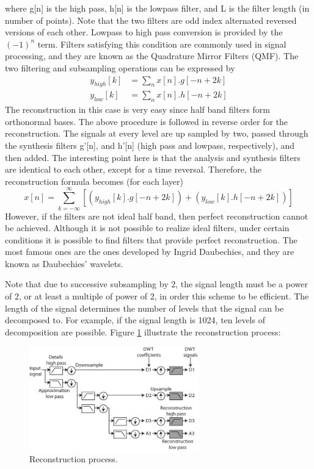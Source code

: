\documentclass[12pt, a4paper, twoside]{report}
\begin{document}
where g[n] is the high pass, h[n] is the lowpass filter, and L is the filter length (in number of points). Note that the two filters are odd index alternated reversed versions of each other. Lowpass to high pass conversion is provided by the $(-1)^n$ term. Filters satisfying this condition are commonly used in signal processing, and they are known as the Quadrature Mirror Filters (QMF). The two filtering and subsampling operations can be expressed by
\begin{align}
y_{high}[k] &= \sum_{n} x[n].g[-n+2k] \\ 
y_{low}[k] &= \sum_{n} x[n].h[-n+2k]
\end{align}
The reconstruction in this case is very easy since half band filters form orthonormal bases. The above procedure is followed in reverse order for the reconstruction. The signals at every level are up sampled by two, passed through the synthesis filters g’[n], and h’[n] (high pass and lowpass, respectively), and then added. The interesting point here is that the analysis and synthesis filters are identical to each other, except for a time reversal. Therefore, the reconstruction formula becomes (for each layer)
\begin{equation}
x[n] = \sum_{k=-\infty}^{\infty} \left [ \left ( y_{high}[k].g[-n+2k] \right ) + \left ( y_{low}[k].h[-n+2k] \right ) \right ]
\end{equation}
However, if the filters are not ideal half band, then perfect reconstruction cannot be achieved. Although it is not possible to realize ideal filters, under certain conditions it is possible to find filters that provide perfect reconstruction. The most famous ones are the ones developed by Ingrid Daubechies, and they are known as Daubechies’ wavelets.
\par
Note that due to successive subsampling by 2, the signal length must be a power of 2, or at least a multiple of power of 2, in order this scheme to be efficient. The length of the signal determines the number of levels that the signal can be decomposed to. For example, if the signal length is 1024, ten levels of decomposition are possible. Figure \ref{fig:dwt-reconstruction} illustrate the reconstruction process:
\begin{figure}[!h]
	\centering
	\includegraphics[width=0.65\textwidth]
	{images/chapter3/dwt-reconstruction}
	\caption{Reconstruction process.}
	\label{fig:dwt-reconstruction}
\end{figure}
\end{document}
